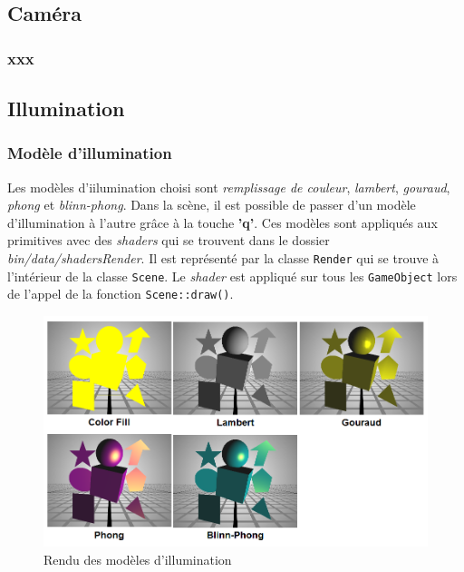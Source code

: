 \subsection{Caméra}
\subsubsection{xxx}

\subsection{Illumination}
\subsubsection{Modèle d'illumination}
Les modèles d'iilumination choisi sont \textit{remplissage de couleur}, \textit{lambert}, \textit{gouraud}, \textit{phong} et \textit{blinn-phong}. Dans la scène, il est possible de passer d'un modèle d'illumination à l'autre grâce à la touche \textbf{'q'}. Ces modèles sont appliqués aux primitives avec des \textit{shaders} qui se trouvent dans le dossier \textit{bin/data/shadersRender}. Il est représenté par la classe \texttt{Render} qui se trouve à l'intérieur de la classe \texttt{Scene}. Le \textit{shader} est appliqué sur tous les \texttt{GameObject} lors de l'appel de la fonction \texttt{Scene::draw()}.

\begin{figure}[H]
    \centering
	\includegraphics[scale=0.6]{img/infog-image-modele-illumination.png}
	\caption{Rendu des modèles d'illumination}
	\label{fig:illuminationmodel}
\end{figure}

